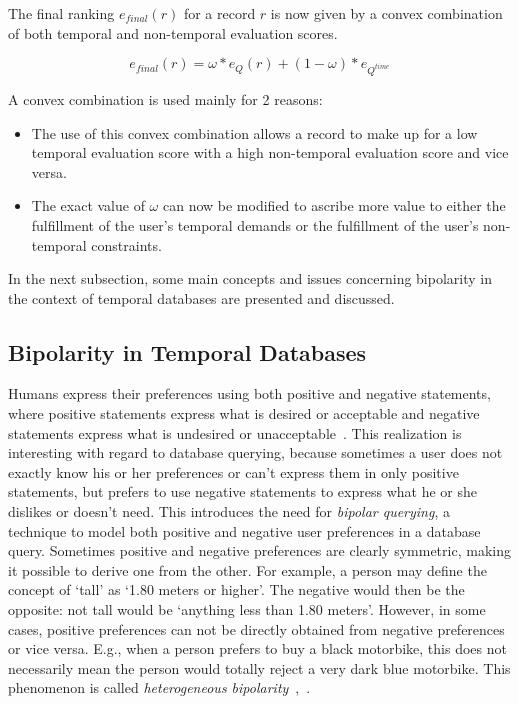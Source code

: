 
The final ranking $e_{final}(r)$ for a record $r$ is now given by a convex combination of both temporal and non-temporal evaluation scores.

\begin{equation}
\label{eq:convex-combination}
e_{final} \left( r \right) = \omega \ast e_{Q} \left( r \right) + \left( 1- \omega \right) \ast e_{Q^{time}}
\end{equation}

A convex combination is used mainly for 2 reasons:
\begin{itemize}
	\item The use of this convex combination allows a record to make up for a low temporal evaluation score with a high non-temporal evaluation score and vice versa.
	\item The exact value of $\omega$ can now be modified to ascribe more value to either the fulfillment of the user's temporal demands or the fulfillment of the user's non-temporal constraints.
\end{itemize}

In the next subsection, some main concepts and issues concerning bipolarity in the context of temporal databases are presented and discussed.

\subsection{Bipolarity in Temporal Databases}
\label{subsubsec:bipolarity}
Humans express their preferences using both positive and negative statements, where positive statements express what is desired or acceptable and negative statements express what is undesired or unacceptable~\cite{Billiet:Pons:Matthe:DeTre:Pons:2011:BipolarFuzzy}. This realization is interesting with regard to database querying, because sometimes a user does not exactly know his or her preferences or can't express them in only positive statements, but prefers to use negative statements to express what he or she dislikes or doesn't need. This introduces the need for \emph{bipolar querying}, a technique to model both positive and negative user preferences in a database query. Sometimes positive and negative preferences are clearly symmetric, making it possible to derive one from the other. For example, a person may define the concept of `tall' as `1.80 meters or higher'. The negative would then be the opposite: not tall would be `anything less than 1.80 meters'. However, in some cases, positive preferences can not be directly obtained from negative preferences or vice versa. E.g., when a person prefers to buy a black motorbike, this does not necessarily mean the person would totally reject a very dark blue motorbike. This phenomenon is called \emph{heterogeneous bipolarity}~\cite{Dubois2006},~\cite{Dubois2008}.

